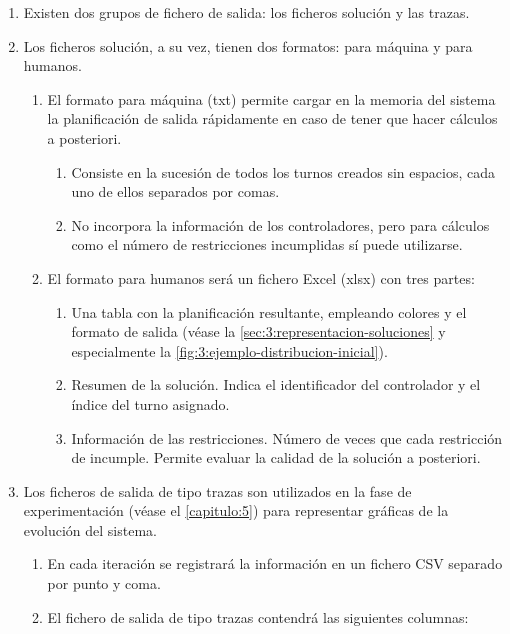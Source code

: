 \begin{enumerate}[label={\textbf{RIO\arabic*}}, ref={Requisito RIO\arabic*},  align=left]
	\item Existen dos grupos de fichero de salida: los ficheros solución y las trazas.
	\item Los ficheros solución, a su vez, tienen dos formatos: para máquina y para humanos.
	\begin{enumerate}[label*={\textbf{.\arabic*}}, ref={\theenumi.\arabic*}]
		\item El formato para máquina (txt) permite cargar en la memoria del sistema la planificación de salida rápidamente en caso de tener que hacer cálculos a posteriori.
		\begin{enumerate}[label*={\textbf{.\arabic*}}]
			\item Consiste en la sucesión de todos los turnos creados sin espacios, cada uno de ellos separados por comas.
			\item No incorpora la información de los controladores, pero para cálculos como el número de restricciones incumplidas sí puede utilizarse.
		\end{enumerate}
		\item \label{RIO:formato-excel} El formato para humanos será un fichero Excel (xlsx) con tres partes:
		\begin{enumerate}[label*={\textbf{.\arabic*}}]
			\item Una tabla con la planificación resultante, empleando colores y el formato de salida (véase la \autoref{sec:3:representacion-soluciones} y especialmente la \autoref{fig:3:ejemplo-distribucion-inicial}).
			\item Resumen de la solución. Indica el identificador del controlador y el índice del turno asignado.
			\item Información de las restricciones. Número de veces que cada restricción de incumple. Permite evaluar la calidad de la solución a posteriori.
		\end{enumerate}
	\end{enumerate}
	\item \label{RIO:salida-csv} Los ficheros de salida de tipo trazas son utilizados en la fase de experimentación (véase el \autoref{capitulo:5}) para representar gráficas de la evolución del sistema.
	\begin{enumerate}[label*={\textbf{.\arabic*}}]
		\item En cada iteración se registrará la información en un fichero CSV separado por punto y coma.
		\item El fichero de salida de tipo trazas contendrá las siguientes columnas:
		\begin{itemize}

\end{itemize}
\end{enumerate}
\end{enumerate}
